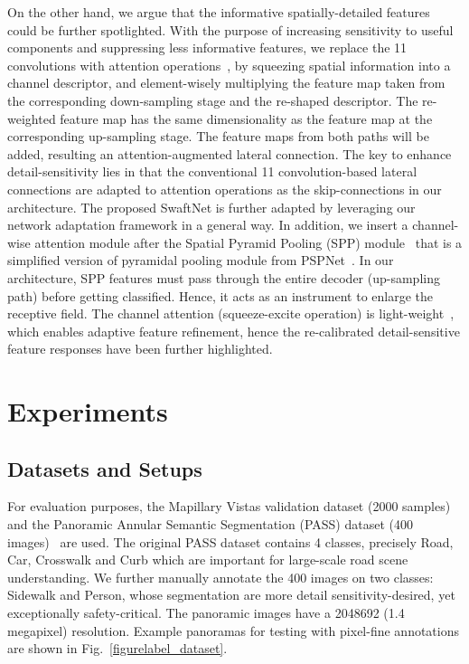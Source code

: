 \documentclass[letterpaper, 10 pt, conference]{ieeeconf}
\begin{document}
On the other hand, we argue that the informative spatially-detailed features could be further spotlighted. With the purpose of increasing sensitivity to useful components and suppressing less informative features, we replace the 11 convolutions with attention operations~\cite{hu2018squeeze}, by squeezing spatial information into a channel descriptor, and element-wisely multiplying the feature map taken from the corresponding down-sampling stage and the re-shaped descriptor. The re-weighted feature map has the same dimensionality as the feature map at the corresponding up-sampling stage. The feature maps from both paths will be added, resulting an attention-augmented lateral connection. The key to enhance detail-sensitivity lies in that the conventional 11 convolution-based lateral connections are adapted to attention operations as the skip-connections in our architecture. The proposed SwaftNet is 
further adapted by leveraging our network adaptation framework in a general way. In addition, we insert a channel-wise attention module after the Spatial Pyramid Pooling (SPP) module~\cite{orsic2019defense} that is a simplified version of pyramidal pooling module from PSPNet~\cite{zhao2017pyramid}. In our architecture, SPP features must pass through the entire decoder (up-sampling path) before getting classified. Hence, it acts as an instrument to enlarge the receptive field. The channel attention (squeeze-excite operation) is light-weight~\cite{hu2018squeeze}, which enables adaptive feature refinement, hence the re-calibrated detail-sensitive feature responses have been further highlighted.

\section{Experiments}

\subsection{Datasets and Setups}

For evaluation purposes, the Mapillary Vistas validation dataset (2000 samples)~\cite{neuhold2017mapillary} and the Panoramic Annular Semantic Segmentation (PASS) dataset (400 images)~\cite{yang2019can} are used. The original PASS dataset contains 4 classes, precisely Road, Car, Crosswalk and Curb which are important for large-scale road scene understanding. We further manually annotate the 400 images on two classes: Sidewalk and Person, whose segmentation are more detail sensitivity-desired, yet exceptionally safety-critical. The panoramic images have a 2048692 (1.4 megapixel) resolution. Example panoramas for testing with pixel-fine annotations are shown in Fig.~\ref{figurelabel_dataset}.
\end{document}

